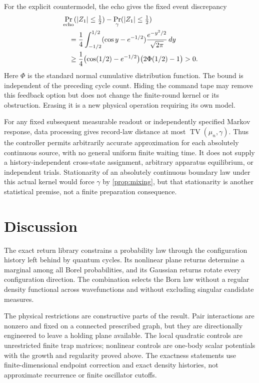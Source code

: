\documentclass[11pt]{article}
\numberwithin{equation}{section}
\theoremstyle{definition}
\begin{document}
For the explicit countermodel, the echo gives the fixed event discrepancy
\begin{align*}
 &\Pr_{\rm echo}(|Z_1|\le\tfrac12)-\Pr_\gamma(|Z_1|\le\tfrac12)\\
 &\quad=\frac14\int_{-1/2}^{1/2}
       (\cos y-e^{-1/2})\frac{e^{-y^2/2}}{\sqrt{2\pi}}\,dy\\
 &\quad\ge\frac14\bigl(\cos(1/2)-e^{-1/2}\bigr)
                  \bigl(2\Phi(1/2)-1\bigr)>0.
\end{align*}
Here $\Phi$ is the standard normal cumulative distribution function. The bound is independent of the preceding cycle count. Hiding the command tape may remove this feedback option but does not change the finite-round kernel or its obstruction. Erasing it is a new physical operation requiring its own model.

For any fixed subsequent measurable readout or independently specified Markov response, data processing gives record-law distance at most $\operatorname{TV}(\mu_n,\gamma)$. Thus the controller permits arbitrarily accurate approximation for each absolutely continuous source, with no general uniform finite waiting time. It does not supply a history-independent cross-state assignment, arbitrary apparatus equilibrium, or independent trials. Stationarity of an absolutely continuous boundary law under this actual kernel would force $\gamma$ by \cref{prop:mixing}, but that stationarity is another statistical premise, not a finite preparation consequence.

\section{Discussion}

The exact return library constrains a probability law through the
configuration history left behind by quantum cycles. Its nonlinear
plane returns determine a marginal among all Borel probabilities,
and its Gaussian returns rotate every configuration direction.
The combination selects the Born law without a regular density
functional across wavefunctions and without excluding singular
candidate measures.

The physical restrictions are constructive parts of the result.
Pair interactions are nonzero and fixed on a connected prescribed
graph, but they are directionally engineered to leave a holding
plane available. The local quadratic controls are unrestricted
finite trap matrices; nonlinear controls are one-body scalar
potentials with the growth and regularity proved above. The
exactness statements use finite-dimensional endpoint correction
and exact density histories, not approximate recurrence or
finite oscillator cutoffs.
\end{document}

